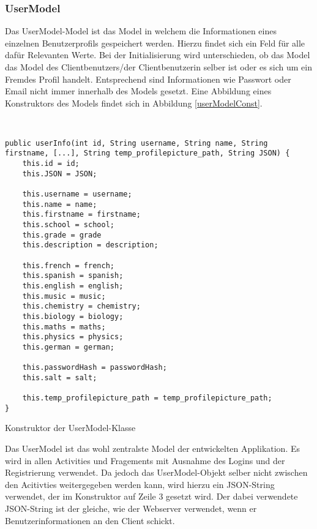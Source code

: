 \documentclass[../main.tex]{subfiles}
\begin{document}
	\subsubsection{UserModel}
	Das UserModel-Model ist das Model in welchem die Informationen eines einzelnen Benutzerprofils gespeichert werden. Hierzu findet sich ein Feld für alle dafür Relevanten Werte. Bei der Initialisierung wird unterschieden, ob das Model das Model des Clientbenutzers/der Clientbenutzerin selber ist oder es sich um ein Fremdes Profil handelt. Entsprechend sind Informationen wie Passwort oder Email nicht immer innerhalb des Models gesetzt. Eine Abbildung eines Konstruktors des Models findet sich in Abbildung \ref{userModelConst}.
	
	\begin{code}
	\begin{center}
		\begin{verbatim}
		
	
public userInfo(int id, String username, String name, String firstname, [...], String temp_profilepicture_path, String JSON) {
	this.id = id;
	this.JSON = JSON;

	this.username = username;
	this.name = name;
	this.firstname = firstname;
	this.school = school;
	this.grade = grade
	this.description = description;
	
	this.french = french;
	this.spanish = spanish;
	this.english = english;
	this.music = music;
	this.chemistry = chemistry;
	this.biology = biology;
	this.maths = maths;
	this.physics = physics;
	this.german = german;
	
	this.passwordHash = passwordHash;
	this.salt = salt;

	this.temp_profilepicture_path = temp_profilepicture_path;
}
		\end{verbatim}
		\caption{Konstruktor der UserModel-Klasse}
		\label{userModelConst}
	\end{center}
	
\end{code}
	Das UserModel ist das wohl zentralste Model der entwickelten Applikation. Es wird in allen Activities und Fragements mit Ausnahme des Logins und der Registrierung verwendet. Da jedoch das UserModel-Objekt selber nicht zwischen den Acitivties weitergegeben werden kann, wird hierzu ein JSON-String verwendet, der im Konstruktor auf Zeile 3 gesetzt wird. Der dabei verwendete JSON-String ist der gleiche, wie der Webserver verwendet, wenn er Benutzerinformationen an den Client schickt.
	
\end{document}
